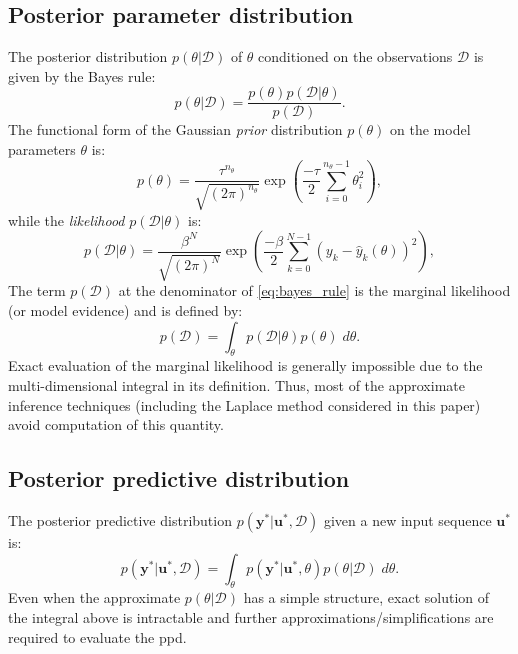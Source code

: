 \documentclass{ifacconf}
\newcommand{\nsamp}{N}
\newcommand{\npar}{{n_\theta}}
\newcommand{\tvec}[1]{{\mathbf{#1}}}
\newcommand{\mean}[1]{\hat{#1}}
\newcommand{\D}{\mathcal{D}} %
\begin{document}
\subsection{Posterior parameter distribution}
The  posterior distribution $p(\theta |  \D)$ of $\theta$ conditioned on the observations $\D$ is given by the Bayes rule:
\begin{equation}
\label{eq:bayes_rule}
p(\theta |  \D) = \frac{p(\theta) p(\D|\theta)}{p(\D)}.
\end{equation}
The functional form of the Gaussian \emph{prior} distribution $p(\theta)$ on the model parameters $\theta$ is:
\begin{equation}
\label{eq:theta_prior}
p(\theta) = \frac{\tau^\npar}{\sqrt{(2\pi)^{\npar} }} \exp\left(\frac{-\tau}{2} \sum_{i=0}^{\npar-1} \theta_i^2\right),
\end{equation}
while the \emph{likelihood} $p(\mathcal{D}|\theta)$ is:
\begin{equation}
\label{eq:likelihood}
p(\mathcal{D}|\theta) = \frac{\beta^\nsamp}{\sqrt{(2\pi)^{\nsamp} }} \exp\left(\frac{-\beta}{2}\sum_{k=0}^{\nsamp-1}{(y_k - \mean{y}_k(\theta))^2}\right),
\end{equation}
The term $p(\D)$ at the denominator of \eqref{eq:bayes_rule} is the marginal likelihood (or model evidence) and is defined by:
\begin{equation}
\label{eq:marginal_likelihood}
p(\D) = \int_{\theta} {p(\D|\theta) p(\theta)} \; d\theta. 
\end{equation}
Exact evaluation of the marginal likelihood is generally impossible due to the multi-dimensional integral in its definition. 
Thus, most of the approximate inference techniques (including the Laplace method considered in this paper) avoid computation of this quantity.

\subsection{Posterior predictive distribution}
The posterior predictive distribution $p(\tvec{y}^* | \tvec{u}^*, \D)$ given a new input sequence $\tvec{u}^*$ is:%
\begin{equation}
\label{eq:posterior_predictive}
p(\tvec{y}^* | \tvec{u}^*, \D) = \int_{\theta} p(\tvec{y}^* | \tvec{u}^*, \theta) p(\theta | \D) \; d\theta.
\end{equation}
Even when the approximate $p(\theta | \D)$ has a simple structure, exact solution of the integral above is intractable and further approximations/simplifications are required to evaluate the ppd.
\end{document}

